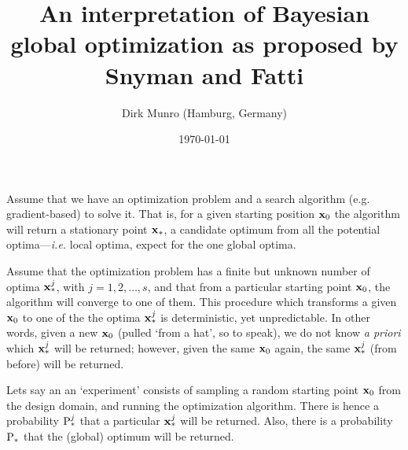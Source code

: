 \documentclass[11pt]{article}
\title{An interpretation of Bayesian global optimization as proposed by Snyman and Fatti \cite{snyman1987}}
\author{Dirk Munro (Hamburg, Germany)}
\date{\today }
\begin{document}
\maketitle

Assume that we have an optimization problem and a search algorithm (e.g. gradient-based) to solve it. That is, for a given starting position $\bx_0$ the algorithm will return a stationary point $\bx_\ast$, a candidate optimum from all the potential optima---\emph{i.e.} local optima, expect for the one global optima. 

Assume that the optimization problem has a finite but unknown number of optima $\bx^j_\ast$, with $j=1,2,\ldots, s$, and that from a particular starting point $\bx_0$, the algorithm will converge to one of them. This procedure which transforms a given $\bx_0$ to one of the the optima $\bx^j_\ast$ is deterministic, yet unpredictable. In other words, given a new $\bx_0$ (pulled `from a hat', so to speak), we do not know \emph{a priori} which $\bx^j_\ast$ will be returned; however, given the same $\bx_0$ again, the same $\bx^j_\ast$ (from before) will be returned.

Lets say an an `experiment' consists of sampling a random starting point $\bx_0$ from the design domain, and running the optimization algorithm. There is hence a probability $\P^j_\ast$ that a particular $\bx^j_\ast$ will be returned. Also, there is a probability $\P_\ast$ that the (global) optimum will be returned.
\end{document}
